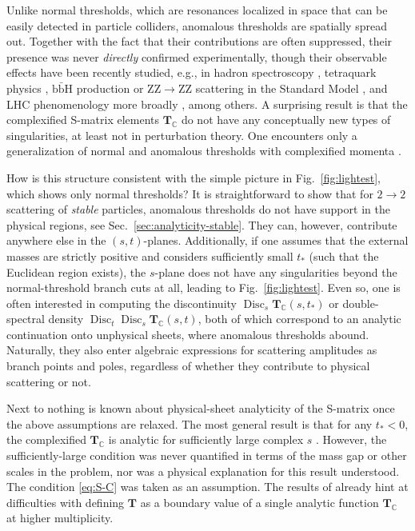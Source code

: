 \documentclass[12pt]{article}
\numberwithin{figure}{section}
\DeclareMathOperator{\Disc}{Disc}
\def \C {\mathbb{C}}
\def \T {\mathbf{T}}
\begin{document}
	Unlike normal thresholds, which are resonances localized in space that can be easily detected in particle colliders, anomalous thresholds are spatially spread out. Together with the fact that their contributions are often suppressed, their presence was never \emph{directly} confirmed experimentally, though their observable effects have been recently studied, e.g., in hadron spectroscopy \cite{Liu:2015taa,Liu:2017vsf,Guo:2017wzr,Abreu:2020jsl}, tetraquark physics \cite{Braaten:2022elw,Achasov:2022onn}, $\mathrm{b}\bar{\mathrm{b}}\mathrm{H}$ production or $\mathrm{ZZ} \to \mathrm{ZZ}$ scattering in the Standard Model \cite{Denner:1996ug,Boudjema:2008zn,Ninh:2008cz}, and LHC phenomenology more broadly \cite{NLOMultilegWorkingGroup:2008bxd,Passarino:2018wix}, among others. 
	A surprising result is that the complexified S-matrix elements $\mathbf{T}_\C$ do not have any conceptually new types of singularities, at least not in perturbation theory. One encounters only a generalization of normal and anomalous thresholds with complexified momenta \cite{Bjorken:1959fd,Landau:1959fi,10.1143/PTP.22.128}.
	
	
	How is this structure consistent with the simple picture in Fig.~\ref{fig:lightest}, which shows only normal thresholds? It is straightforward to show that for $2\to 2$ scattering of \emph{stable} particles, anomalous thresholds do not have support in the physical regions, see Sec.~\ref{sec:analyticity-stable}. They can, however, contribute anywhere else in the $(s,t)$-planes. Additionally, if one assumes that the external masses are strictly positive and considers sufficiently small $t_\ast$ (such that the Euclidean region exists), the $s$-plane does not have any singularities beyond the normal-threshold branch cuts at all, leading to Fig.~\ref{fig:lightest}. Even so, one is often interested in computing the discontinuity $\Disc_s \T_{\C}(s,t_\ast)$ or double-spectral density $\Disc_t \Disc_s \T_\C (s,t)$, both of which correspond to an analytic continuation onto unphysical sheets, where anomalous thresholds abound. Naturally, they also enter algebraic expressions for scattering amplitudes as branch points and poles, regardless of whether they contribute to physical scattering or not.
	
	Next to nothing is known about physical-sheet analyticity of the S-matrix once the above assumptions are relaxed. The most general result is that for any $t_\ast < 0$, the complexified $\mathbf{T}_\C$ is analytic for sufficiently large complex $s$ \cite{Bros:1964iho,Bros:1965kbd}. However, the sufficiently-large condition was never quantified in terms of the mass gap or other scales in the problem, nor was a physical explanation for this result understood. The condition \eqref{eq:S-C} was taken as an assumption. The results of \cite{Bros:1972jh} already hint at difficulties with defining $\T$ as a boundary value of a single analytic function $\T_\C$ at higher multiplicity.
	
\end{document}
